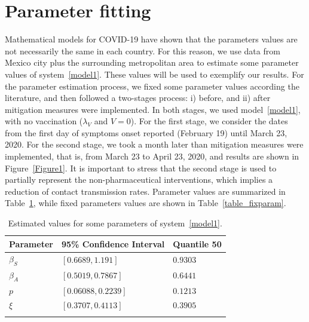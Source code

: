 \documentclass[preprint, sort&compress]{elsarticle}
\begin{document}
 	\section{Parameter fitting}\noindent Mathematical models for COVID-19 have shown that the parameters values are not necessarily the same in each country. For this reason, we use data from Mexico city plus the surrounding metropolitan area to estimate some parameter values of system~\ref{model1}. These values will be used to exemplify our results. For the parameter estimation process, we fixed some parameter values according the literature, and then followed a two-stages process: i) before, and ii) after mitigation measures were implemented. In both stages, we used model~\ref{model1}, with no vaccination ($\lambda_V$ and $V = 0$). For the first stage, we consider the dates from the first day of symptoms onset reported (February 19) until March 23, 2020. For the second stage, we took a month later than mitigation measures were implemented, that is, from March 23 to April 23, 2020, and results are shown in Figure~\ref{Figure1}. It is important to stress that the second stage is used to partially represent the non-pharmaceutical interventions, which implies a reduction of contact transmission rates. Parameter values are summarized in Table~\ref{table_icparam}, while fixed parameters values are shown in Table~\ref{table_fixparam}.

















\begin{table}[h!]
\begin{center}
    \begin{tabular}{>{\centering}p{}p{}p{}}
        \toprule
        Parameter & 95\% Confidence Interval & Quantile 50
        \\
        \midrule
        $\beta_S$ & $[\num{0.6689}, \num{1.191}]$   &  $\num{0.9303}$
        \\
        $\beta_A$ & $[\num{0.5019}, \num{0.7867}]$  &  $\num{0.6441}$
        \\
        $p$       & $[\num{0.06088}, \num{0.2239}]$ &  $\num{0.1213}$
        \\
        $\xi$     & $[\num{0.3707}, \num{0.4113}]$  & $\num{0.3905}$
        \\
\\
    \bottomrule
\end{tabular}
  \caption{Estimated values for some parameters of system~\ref{model1}.}\label{table_icparam}
\end{center}
\end{table}
\end{document}
